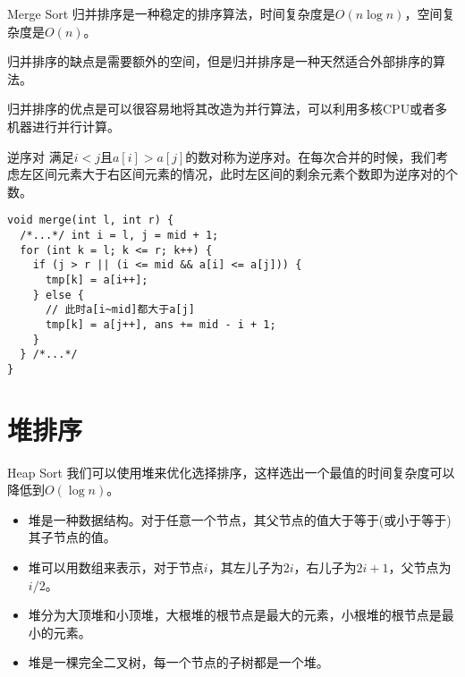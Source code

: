 \documentclass{ldr-simple-gray}
\begin{document}
  \begin{frame}{Merge Sort}
    归并排序是一种稳定的排序算法，时间复杂度是$O(n\log n)$，空间复杂度是$O(n)$。\newline

    归并排序的缺点是需要额外的空间，但是归并排序是一种天然适合外部排序的算法。\newline

    归并排序的优点是可以很容易地将其改造为并行算法，可以利用多核CPU或者多机器进行并行计算。
  \end{frame}

  \begin{frame}[fragile]{逆序对}
    满足$i<j$且$a[i]>a[j]$的数对称为逆序对。在每次合并的时候，我们考虑左区间元素大于右区间元素的情况，此时左区间的剩余元素个数即为逆序对的个数。
    \begin{verbatim}
void merge(int l, int r) {
  /*...*/ int i = l, j = mid + 1;
  for (int k = l; k <= r; k++) {
    if (j > r || (i <= mid && a[i] <= a[j])) {
      tmp[k] = a[i++];
    } else {
      // 此时a[i~mid]都大于a[j]
      tmp[k] = a[j++], ans += mid - i + 1;
    }
  } /*...*/
}\end{verbatim}
  \end{frame}

  \section{堆排序}
  \begin{frame}{Heap Sort}
    我们可以使用堆来优化选择排序，这样选出一个最值的时间复杂度可以降低到$O(\log n)$。
    \begin{itemize}
      \item 堆是一种数据结构。对于任意一个节点，其父节点的值大于等于(或小于等于)其子节点的值。
      \item 堆可以用数组来表示，对于节点$i$，其左儿子为$2i$，右儿子为$2i+1$，父节点为$i/2$。
      \item 堆分为大顶堆和小顶堆，大根堆的根节点是最大的元素，小根堆的根节点是最小的元素。
      \item 堆是一棵完全二叉树，每一个节点的子树都是一个堆。
    \end{itemize}
  \end{frame}
\end{document}
